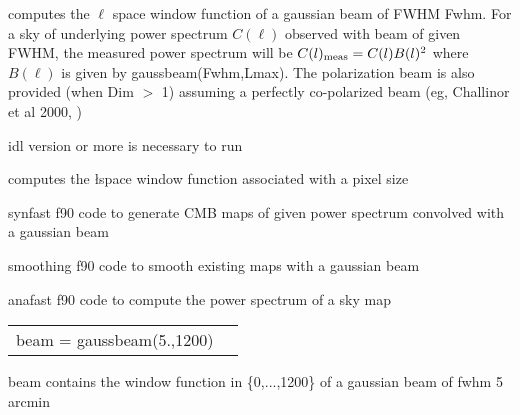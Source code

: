 
\begin{codedescription}
{\facname computes the $\ell$ space window function of a gaussian beam of FWHM
Fwhm. For a sky of underlying power spectrum $C(\ell)$ observed with beam of
given FWHM, the measured power spectrum will be $C(\ell)_{\rm meas} = C(\ell)
B(\ell)^2$ where $B(\ell)$ is given by gaussbeam(Fwhm,Lmax). The
polarization beam is also provided (when Dim $>$ 1) assuming a perfectly
co-polarized beam (eg, Challinor et al 2000, 
)}
\end{codedescription}



\begin{related}
  \begin{sulist}{} %
    \item[idl] version \idlversion or more is necessary to run \facname
    \item[\htmlref{healpixwindow}{idl:healpixwindow}] computes the \l space window function associated with
    a \healpix pixel size
    \item[synfast] f90 code to generate CMB maps of given power spectrum convolved with a gaussian beam
    \item[smoothing] f90 code to smooth existing \healpix maps with a gaussian beam
    \item[anafast] f90 code to compute the power spectrum of a \healpix sky map
  \end{sulist}
\end{related}

\begin{example}
{
\begin{tabular}{ll} %
beam = gaussbeam(5.,1200)
\end{tabular}
}
{
beam contains the window function in \{0,...,1200\} of a gaussian beam of fwhm 5 arcmin}
\end{example}


